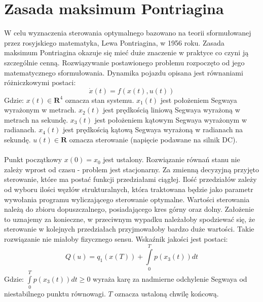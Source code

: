 \section{Zasada maksimum Pontriagina}
\label{sec:zasada_max}

W celu wyznaczenia sterowania optymalnego bazowano na teorii sformułowanej przez rosyjskiego matematyka, Lewa Pontriagina, w 1956 roku. Zasada maksimum Pontriagina okazuje się mieć duże znaczenie w praktyce co czyni ją szczególnie cenną. Rozwiązywanie postawionego problemu rozpoczęto od jego matematycznego sformułowania. Dynamika pojazdu opisana jest równaniami różniczkowymi postaci:
\begin{equation}
\dot{x}(t)=f(x(t),u(t))
\end{equation}
\noindent Gdzie:\newline
$x(t)\in\textbf{R}^{4}$ oznacza stan systemu.\newline
$x_1(t)$ jest położeniem Segwaya wyrażonym w metrach.\newline
$x_2(t)$ jest prędkością liniową Segwaya wyrażoną w metrach na sekundę.\newline
$x_3(t)$ jest położeniem kątowym Segwaya wyrażonym w radianach.\newline
$x_4(t)$ jest prędkością kątową Segwaya wyrażoną w radianach na sekundę.\newline
$u(t)\in\textbf{R}$ oznacza sterowanie (napięcie podawane na silnik DC).\newline
\paragraph*{}
Punkt początkowy $x(0)=x_0$ jest ustalony. Rozwiązanie równań stanu nie zależy wprost od czasu - problem jest stacjonarny. Za zmienną decyzyjną przyjęto sterowanie, które ma postać funkcji przedziałami ciągłej. Ilość przedziałów zależy od wyboru ilości węzłów strukturalnych, która traktowana będzie jako parametr wywołania programu wyliczającego sterowanie optymalne. Wartości sterowania należą do zbioru dopuszczalnego, posiadającego kres górny oraz dolny. Założenie to uznajemy za konieczne, w przeciwnym wypadku należałoby spodziewać się, że sterowanie w kolejnych przedziałach przyjmowałoby bardzo duże wartości. Takie rozwiązanie nie miałoby fizycznego sensu. Wskaźnik jakości jest postaci:
\begin{equation}
Q(u)=q_1(x(T))+\int\limits_{0}^{T}p(x_3(t))dt
\end{equation}
\noindent Gdzie:\newline
\(\int\limits_{0}^{T}p(x_3(t))dt\geq0\) wyraża karę za nadmierne odchylenie Segwaya od niestabilnego punktu równowagi.\newline
\(T\) oznacza ustaloną chwilę końcową.
